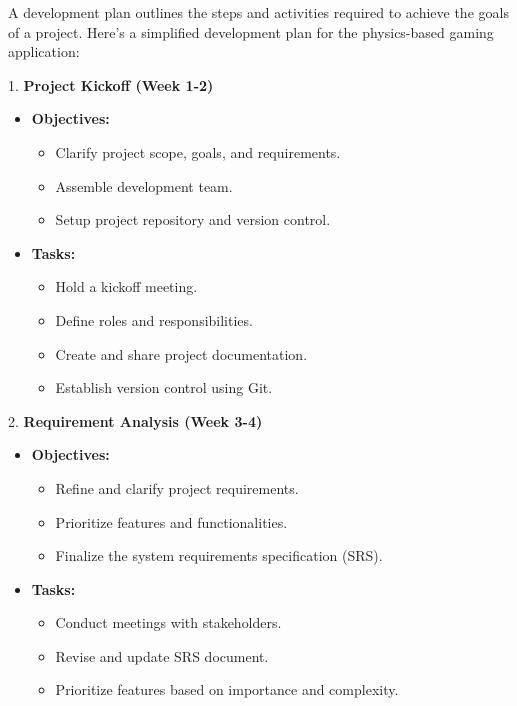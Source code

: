 \documentclass[
]{article}
\begin{document}
A development plan outlines the steps and activities required to achieve
the goals of a project. Here's a simplified development plan for the
physics-based gaming application:

1. \textbf{Project Kickoff (Week 1-2)}

\begin{itemize}
\item
  \textbf{Objectives:}

  \begin{itemize}
  \item
    Clarify project scope, goals, and requirements.
  \item
    Assemble development team.
  \item
    Setup project repository and version control.
  \end{itemize}
\item
  \textbf{Tasks:}

  \begin{itemize}
  \item
    Hold a kickoff meeting.
  \item
    Define roles and responsibilities.
  \item
    Create and share project documentation.
  \item
    Establish version control using Git.
  \end{itemize}
\end{itemize}

2. \textbf{Requirement Analysis (Week 3-4)}

\begin{itemize}
\item
  \textbf{Objectives:}

  \begin{itemize}
  \item
    Refine and clarify project requirements.
  \item
    Prioritize features and functionalities.
  \item
    Finalize the system requirements specification (SRS).
  \end{itemize}
\item
  \textbf{Tasks:}

  \begin{itemize}
  \item
    Conduct meetings with stakeholders.
  \item
    Revise and update SRS document.
  \item
    Prioritize features based on importance and complexity.
  \end{itemize}
\end{itemize}
\end{document}
